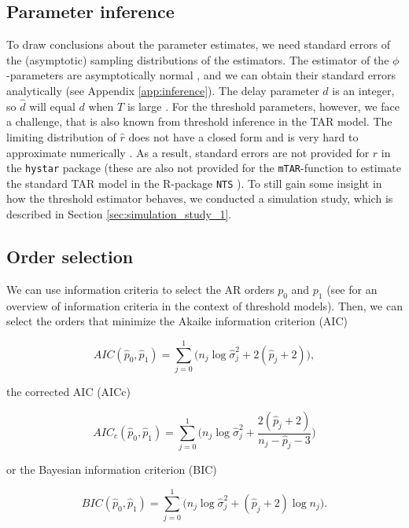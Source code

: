 \documentclass{article}
\begin{document}
\subsection{Parameter inference}
To draw conclusions about the parameter estimates, we need standard errors of the (asymptotic) sampling distributions of the estimators.
The estimator of the $\phi$-parameters are asymptotically normal \citep{bar2}, and we can obtain their standard errors analytically (see Appendix \ref{app:inference}).
The delay parameter $d$ is an integer, so $\hat{d}$ will equal $d$ when $T$ is large \citep{bar2}.
For the threshold parameters, however, we face a challenge, that is also known from threshold inference in the TAR model. 
The limiting distribution of $\hat{r}$ does not have a closed form and is very hard to approximate numerically \citep{bar2, li_least_2012}.
As a result, standard errors are not provided for $\hat{r}$ in the \texttt{hystar} package (these are also not provided for the \texttt{mTAR}-function to estimate the standard TAR model in the \textsf{R}-package \texttt{NTS} \citep{R_NTS}). 
To still gain some insight in how the threshold estimator behaves, we conducted a simulation study, which is described in Section \ref{sec:simulation_study_1}.

\subsection{Order selection}
\label{sec:selecting_AR_orders}
We can use information criteria to select the AR orders $p_0$ and $p_1$ (see \citet{information_criteria_tar} for an overview of information criteria in the context of threshold models). 
Then, we can select the orders that minimize the Akaike information criterion (AIC)

\begin{equation}
AIC(\hat{p}_0, \hat{p}_1) = \sum_{j = 0}^{1} \Big(n_j \log \hat{\sigma}_{j}^2 + 2(\hat{p}_j + 2) \Big),
\end{equation}

the corrected AIC (AICc)

\begin{equation}
AIC_c(\hat{p}_0, \hat{p}_1) = \sum_{j = 0}^{1} \Bigg( n_j \log \hat{\sigma}_{j}^2 + 
\frac{2(\hat{p}_j + 2)}{n_j - \hat{p}_j - 3} \Bigg)
\end{equation}

or the Bayesian information criterion (BIC)

\begin{equation}
BIC(\hat{p}_0, \hat{p}_1) = \sum_{j = 0}^{1} \Big( n_j \log \hat{\sigma}_{j}^2 + (\hat{p}_j + 2)  \log n_j \Big).
\end{equation}
\end{document}
